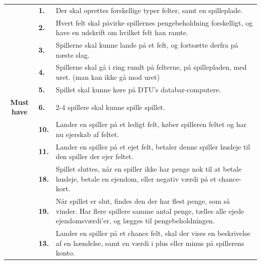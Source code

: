 \begin{center}
    \begin{tabular}{ || c | l | p{11.5cm} ||}
        \hline
        \hline
    &        
    \textbf{1.}
    &
    Der skal oprettes forskellige typer felter, samt en spilleplade. \\

    \cline{2-3}
    &
    \textbf{2.}
    & 
    Hvert felt skal påvirke spillernes pengebeholdning forskelligt, og have en udskrift om hvilket felt han ramte. \\
    
    \cline{2-3}
    &
    \textbf{3.}
    &
    Spillerne skal kunne lande på et felt, og fortsætte derfra på næste slag. \\

    \cline{2-3}
    &
    \textbf{4.}
    &
    Spillerne skal gå i ring rundt på felterne, på spillepladen, med uret. (man kan ikke gå mod uret) \\

    \cline{2-3}
    &
    \textbf{5.} 
    &
    Spillet skal kunne køre på DTU’s databar-computere. \\
    
    \cline{2-3}
    \textbf{Must have}
    &
    \textbf{6.}
    &
    2-4 spillere skal kunne spille spillet. \\
    
    \cline{2-3}
    &
    \textbf{10.}
    &
    Lander en spiller på et ledigt felt, køber spilleren feltet og 
    har nu ejerskab af feltet. \\

    \cline{2-3}
    &
    \textbf{11.}
    &
    Lander en spiller på et ejet felt, betaler denne spiller husleje til den spiller der ejer feltet. \\

    \cline{2-3}
    &
    \textbf{18.}
    &
    Spillet sluttes, når en spiller ikke har penge nok til at betale husleje, betale en ejendom, eller negativ værdi på et chance-kort. \\

    \cline{2-3}
    &
    \textbf{19.}
    &
    Når spillet er slut, findes den der har flest penge, som så vinder. Har flere spillere samme antal penge, tælles alle ejede ejendomsværdi’er, og lægges til pengebeholdningen. \\
    
    \hline
    \hline
    &
    \textbf{13.}
    &
    Lander en spiller på et chance felt, skal der vises en beskrivelse af en hændelse, samt en værdi i plus eller minus på spillerens konto. \\
    

\end{tabular}
\end{center}

